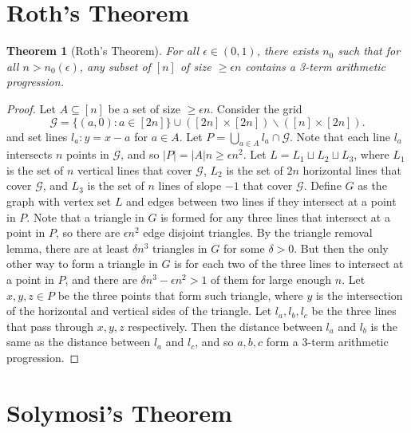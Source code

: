\documentclass[12pt,reqno]{amsart}
\newtheorem{theorem}{Theorem}[section]
\theoremstyle{definition}
\theoremstyle{remark}
\renewcommand{\geq}{\geqslant}
\numberwithin{equation}{section}
\begin{document}
\newpage

\section{Roth's Theorem}

\begin{theorem}[Roth's Theorem]
	For all $\epsilon \in (0, 1)$, there exists $n_0$ such that for all $n > n_0(\epsilon)$, any subset of $[n]$ of size $\geq \epsilon n$ contains a 3-term arithmetic progression.
\end{theorem}

\begin{proof}
	Let $A \subseteq [n]$ be a set of size $\geq \epsilon n$. Consider the grid
	\[
		\mathscr{G} = \{(a, 0) : a \in [2n]\} \cup ([2n] \times [2n]) \backslash ([n] \times [2n]).
	\]
	and set lines $l_a : y = x - a$ for $a \in A$. Let $P = \bigcup_{a \in A} l_a \cap \mathscr{G}$. Note that each line $l_a$ intersects $n$ points in $\mathscr{G}$, and so $|P| = |A|n \geq \epsilon n^2$. Let $L = L_1 \sqcup L_2 \sqcup L_3$, where $L_1$ is the set of $n$ vertical lines that cover $\mathscr{G}$, $L_2$ is the set of $2n$ horizontal lines that cover $\mathscr{G}$, and $L_3$ is the set of $n$ lines of slope $-1$ that cover $\mathscr{G}$. Define $G$ as the graph with vertex set $L$ and edges between two lines if they intersect at a point in $P$. Note that a triangle in $G$ is formed for any three lines that intersect at a point in $P$, so there are $\epsilon n^2$ edge disjoint triangles. By the triangle removal lemma, there are at least $\delta n^3$ triangles in $G$ for some $\delta > 0$. But then the only other way to form a triangle in $G$ is for each two of the three lines to intersect at a point in $P$, and there are $\delta n^3 - \epsilon n^2 > 1$ of them for large enough $n$. Let $x, y, z \in P$ be the three points that form such triangle, where $y$ is the intersection of the horizontal and vertical sides of the triangle. Let $l_a, l_b, l_c$ be the three lines that pass through $x, y, z$ respectively. Then the distance between $l_a$ and $l_b$ is the same as the distance between $l_a$ and $l_c$, and so $a, b, c$ form a 3-term arithmetic progression. 
\end{proof}

\newpage

\section{Solymosi's Theorem}
\end{document}
